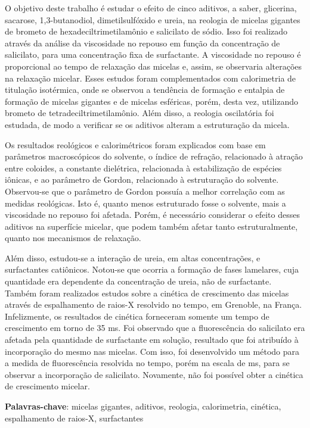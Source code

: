 \documentclass[
	12pt,				%
	openright,			%
	twoside,			%
	a4paper,			%
	english,			%
	brazil%
	]{abntex2}
\begin{document}
\setlength{\absparsep}{18pt} %
\begin{resumo}
 	O objetivo deste trabalho é estudar o efeito de cinco aditivos, a saber, glicerina, sacarose, 1,3-butanodiol, dimetilsulfóxido e ureia, na reologia de micelas gigantes de brometo de hexadeciltrimetilamônio e salicilato de sódio. Isso foi realizado através da análise da viscosidade no repouso em função da concentração de salicilato, para uma concentração fixa de surfactante. A viscosidade no repouso é proporcional ao tempo de relaxação das micelas e, assim, se observaria alterações na relaxação micelar. Esses estudos foram complementados com calorimetria de titulação isotérmica, onde se observou a tendência de formação e entalpia de formação de micelas gigantes e de micelas esféricas, porém, desta vez, utilizando brometo de tetradeciltrimetilamônio. Além disso, a reologia oscilatória foi estudada, de modo a verificar se os aditivos alteram a estruturação da micela.
 	
	Os resultados reológicos e calorimétricos foram explicados com base em parâmetros macroscópicos do solvente, o índice de refração, relacionado à atração entre coloides, a constante dielétrica, relacionada à estabilização de espécies iônicas, e ao parâmetro de Gordon, relacionado à estruturação do solvente. Observou-se que o parâmetro de Gordon possuía a melhor correlação com as medidas reológicas. Isto é, quanto menos estruturado fosse o solvente, mais a viscosidade no repouso foi afetada. Porém, é necessário considerar o efeito desses aditivos na superfície micelar, que podem também afetar tanto estruturalmente, quanto nos mecanismos de relaxação.
	
	Além disso, estudou-se a interação de ureia, em altas concentrações, e surfactantes catiônicos. Notou-se que ocorria a formação de fases lamelares, cuja quantidade era dependente da concentração de ureia, não de surfactante. Também foram realizados estudos sobre a cinética de crescimento das micelas através de espalhamento de raios-X resolvido no tempo, em Grenoble, na França. Infelizmente, os resultados de cinética forneceram somente um tempo de crescimento em torno de 35 ms. Foi observado que a fluorescência do salicilato era afetada pela quantidade de surfactante em solução, resultado que foi atribuído à incorporação do mesmo nas micelas. Com isso, foi desenvolvido um método para a medida de fluorescência resolvida no tempo, porém na escala de ms, para se observar a incorporação de salicilato. Novamente, não foi possível obter a cinética de crescimento micelar.
	
 \textbf{Palavras-chave}: micelas gigantes, aditivos, reologia, calorimetria, cinética, espalhamento de raios-X, surfactantes
\end{resumo}
\end{document}
